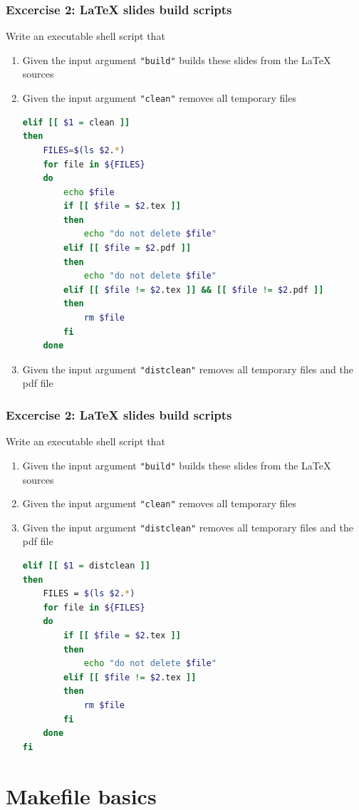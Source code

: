 \documentclass[10pt,c,ignorenonframetext]{beamer}
\begin{document}
\begin{frame}[fragile]
\frametitle{Excercise 2: LaTeX slides build scripts}
Write an executable shell script that
\begin{enumerate}
\item Given the input argument {\tt "build"} builds these slides from the LaTeX sources
\item Given the input argument {\tt "clean"} removes all temporary files
{\tiny
\begin{lstlisting}[language=bash]
elif [[ $1 = clean ]]
then
    FILES=$(ls $2.*)   
    for file in ${FILES}
    do
        echo $file
        if [[ $file = $2.tex ]]
        then
            echo "do not delete $file"
        elif [[ $file = $2.pdf ]]
        then
            echo "do not delete $file"
        elif [[ $file != $2.tex ]] && [[ $file != $2.pdf ]]
        then
            rm $file
        fi        
    done
\end{lstlisting}
}
\item Given the input argument {\tt "distclean"} removes all temporary files and the pdf file
\end{enumerate}
\end{frame}

\begin{frame}[fragile]
\frametitle{Excercise 2: LaTeX slides build scripts}
Write an executable shell script that
\begin{enumerate}
\item Given the input argument {\tt "build"} builds these slides from the LaTeX sources
\item Given the input argument {\tt "clean"} removes all temporary files
\item Given the input argument {\tt "distclean"} removes all temporary files and the pdf file
{\tiny
\begin{lstlisting}[language=bash]
elif [[ $1 = distclean ]]
then
    FILES = $(ls $2.*)
    for file in ${FILES}
    do
        if [[ $file = $2.tex ]]
        then
            echo "do not delete $file"
        elif [[ $file != $2.tex ]]
        then
            rm $file
        fi        
    done
fi
\end{lstlisting}
}
\end{enumerate}
\end{frame}

\section{Makefile basics}
\end{document}
